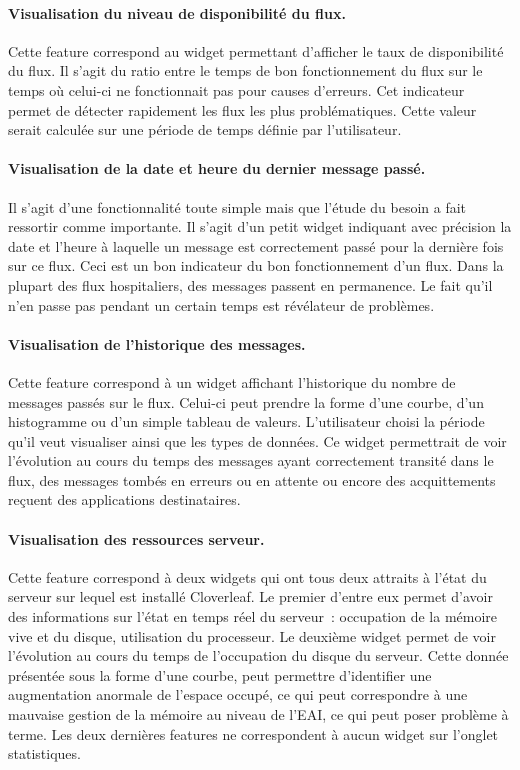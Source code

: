 			\paragraph{Visualisation du niveau de disponibilité du flux.}
			Cette feature correspond au widget permettant d'afficher le taux de
			disponibilité du flux. Il s'agit du ratio entre le temps de bon
			fonctionnement du flux sur le temps où celui-ci ne fonctionnait pas pour
			causes d'erreurs. Cet indicateur permet de détecter rapidement les flux les
			plus problématiques. Cette valeur serait calculée sur une période de temps
			définie par l'utilisateur.
			
			\paragraph{Visualisation de la date et heure du dernier message passé.}
			Il s'agit d'une fonctionnalité toute simple mais que l'étude du besoin a fait
			ressortir comme importante. Il s'agit d'un petit widget indiquant avec
			précision la date et l'heure à laquelle un message est correctement passé
			pour la dernière fois sur ce flux. Ceci est un bon indicateur du bon
			fonctionnement d'un flux. Dans la plupart des flux hospitaliers, des messages
			passent en permanence. Le fait qu'il n'en passe pas pendant un certain temps
			est révélateur de problèmes.
			
			\paragraph{Visualisation de l’historique des messages.}
			Cette feature correspond à un widget affichant l'historique du nombre de
			messages passés sur le flux. Celui-ci peut prendre la forme d'une courbe,
			d'un histogramme ou d'un simple tableau de valeurs. L'utilisateur choisi la
			période qu'il veut visualiser ainsi que les types de données. Ce widget
			permettrait de voir l'évolution au cours du temps des messages ayant
			correctement transité dans le flux, des messages tombés en erreurs ou en
			attente ou encore des acquittements reçuent des applications destinataires.
			
			\paragraph{Visualisation des ressources serveur.}
			Cette feature correspond à deux widgets qui ont tous deux attraits à l'état
			du serveur sur lequel est installé Cloverleaf. Le premier d'entre eux permet
			d'avoir des informations sur l'état en temps réel du serveur~: occupation de
			la mémoire vive et du disque, utilisation du processeur. Le deuxième widget
			permet de voir l'évolution au cours du temps de l'occupation du disque du
			serveur. Cette donnée présentée sous la forme d'une courbe, peut permettre
			d'identifier une augmentation anormale de l'espace occupé, ce qui peut
			correspondre à une mauvaise gestion de la mémoire au niveau de l'EAI, ce qui
			peut poser problème à terme.\newline
			Les deux dernières features ne correspondent à aucun widget sur l'onglet
			statistiques.
			

